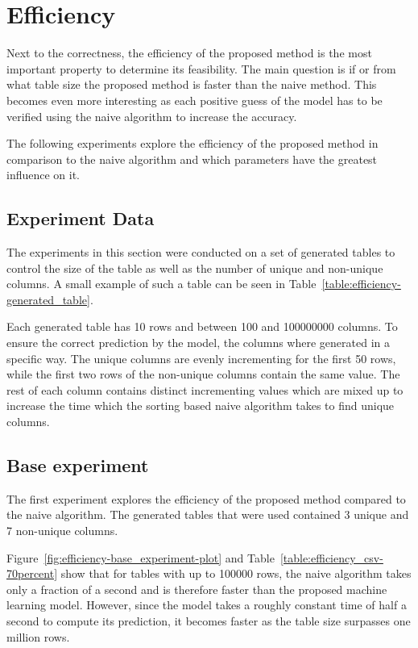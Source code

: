 \section{Efficiency}\label{sec:efficiency}
Next to the correctness, the efficiency of the proposed method is the most important property to determine its feasibility. %
The main question is if or from what table size the proposed method is faster than the naive method. This becomes even more interesting as each positive guess of the model has to be verified using the naive algorithm to increase the accuracy.

The following experiments explore the efficiency of the proposed method in comparison to the naive algorithm and which parameters have the greatest influence on it.


\subsection{Experiment Data}\label{subsec:efficiency-experiment_data}
The experiments in this section were conducted on a set of generated tables to control the size of the table as well as the number of unique and non-unique columns. A small example of such a table can be seen in Table~\ref{table:efficiency-generated_table}.

Each generated table has \num{10} rows and between \num{100} and \num{100000000} columns. To ensure the correct prediction by the model, the columns where generated in a specific way.
The unique columns are evenly incrementing for the first \num{50} rows, while the first two rows of the non-unique columns contain the same value. The rest of each column contains distinct incrementing values which are mixed up to increase the time which the sorting based naive algorithm takes to find unique columns.




\subsection{Base experiment}\label{subsec:efficiency-base_experiment}
The first experiment explores the efficiency of the proposed method compared to the naive algorithm. The generated tables that were used contained \num{3} unique and \num{7} non-unique columns.  %

Figure~\ref{fig:efficiency-base_experiment-plot} and Table~\ref{table:efficiency_csv-70percent} show that for tables with up to \num{100000} rows, the naive algorithm takes only a fraction of a second and is therefore faster than the proposed machine learning model. However, since the model takes a roughly constant time of half a second to compute its prediction, it becomes faster as the table size surpasses one million rows.

